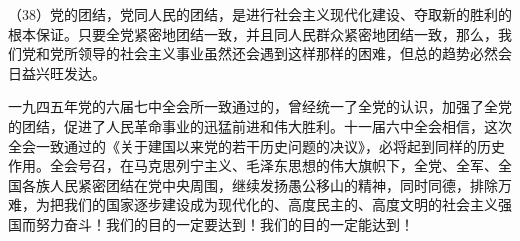 （38）党的团结，党同人民的团结，是进行社会主义现代化建设、夺取新的胜利的根本保证。只要全党紧密地团结一致，并且同人民群众紧密地团结一致，那么，我们党和党所领导的社会主义事业虽然还会遇到这样那样的困难，但总的趋势必然会日益兴旺发达。

一九四五年党的六届七中全会所一致通过的，曾经统一了全党的认识，加强了全党的团结，促进了人民革命事业的迅猛前进和伟大胜利。十一届六中全会相信，这次全会一致通过的《关于建国以来党的若干历史问题的决议》，必将起到同样的历史作用。全会号召，在马克思列宁主义、毛泽东思想的伟大旗帜下，全党、全军、全国各族人民紧密团结在党中央周围，继续发扬愚公移山的精神，同时同德，排除万难，为把我们的国家逐步建设成为现代化的、高度民主的、高度文明的社会主义强国而努力奋斗！我们的目的一定要达到！我们的目的一定能达到！
